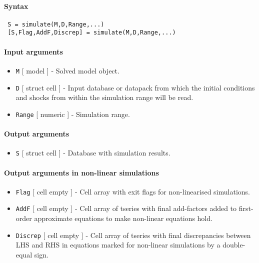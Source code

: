 


	\paragraph{Syntax}
 
 \begin{verbatim}
 S = simulate(M,D,Range,...)
 [S,Flag,AddF,Discrep] = simulate(M,D,Range,...)
 \end{verbatim}
 
 \paragraph{Input arguments}
 
 \begin{itemize}
 \item
   \texttt{M} {[} model {]} - Solved model object.
 \item
   \texttt{D} {[} struct \textbar{} cell {]} - Input database or datapack
   from which the initial conditions and shocks from within the
   simulation range will be read.
 \item
   \texttt{Range} {[} numeric {]} - Simulation range.
 \end{itemize}
 
 \paragraph{Output arguments}
 
 \begin{itemize}
 \item
   \texttt{S} {[} struct \textbar{} cell {]} - Database with simulation
   results.
 \end{itemize}
 
 \paragraph{Output arguments in non-linear simulations}
 
 \begin{itemize}
 \item
   \texttt{Flag} {[} cell \textbar{} empty {]} - Cell array with exit
   flags for non-linearised simulations.
 \item
   \texttt{AddF} {[} cell \textbar{} empty {]} - Cell array of tseries
   with final add-factors added to first-order approximate equations to
   make non-linear equations hold.
 \item
   \texttt{Discrep} {[} cell \textbar{} empty {]} - Cell array of tseries
   with final discrepancies between LHS and RHS in equations marked for
   non-linear simulations by a double-equal sign.
 \end{itemize}
 
